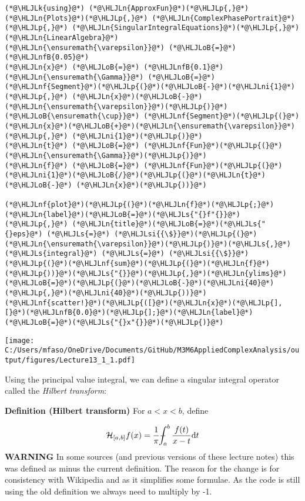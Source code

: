 \documentclass[12pt,a4paper]{article}
\newcommand{\HLJLk}[1]{\textcolor[RGB]{148,91,176}{\textbf{#1}}}
\newcommand{\HLJLn}[1]{#1}
\newcommand{\HLJLnf}[1]{\textcolor[RGB]{66,102,213}{#1}}
\newcommand{\HLJLs}[1]{\textcolor[RGB]{201,61,57}{#1}}
\newcommand{\HLJLsi}[1]{#1}
\newcommand{\HLJLnfB}[1]{\textcolor[RGB]{59,151,46}{#1}}
\newcommand{\HLJLni}[1]{\textcolor[RGB]{59,151,46}{#1}}
\newcommand{\HLJLoB}[1]{\textcolor[RGB]{102,102,102}{\textbf{#1}}}
\newcommand{\HLJLp}[1]{#1}
\def\D{ {\rm d} }
\def\HH{ {\cal H} }
\def\Xint#1{ \mathchoice
   {\XXint\displaystyle\textstyle{#1} }%
   {\XXint\textstyle\scriptstyle{#1} }%
   {\XXint\scriptstyle\scriptscriptstyle{#1} }%
   {\XXint\scriptscriptstyle\scriptscriptstyle{#1} }%
   \!\int}
\def\XXint#1#2#3{ {\setbox0=\hbox{$#1{#2#3}{\int}$}
     \vcenter{\hbox{$#2#3$}}\kern-.5\wd0} }
\def\dashint{\Xint-}
\begin{document}
\begin{lstlisting}
(*@\HLJLk{using}@*) (*@\HLJLn{ApproxFun}@*)(*@\HLJLp{,}@*) (*@\HLJLn{Plots}@*)(*@\HLJLp{,}@*) (*@\HLJLn{ComplexPhasePortrait}@*)(*@\HLJLp{,}@*) (*@\HLJLn{SingularIntegralEquations}@*)(*@\HLJLp{,}@*) (*@\HLJLn{LinearAlgebra}@*)
(*@\HLJLn{\ensuremath{\varepsilon}}@*) (*@\HLJLoB{=}@*) (*@\HLJLnfB{0.05}@*)
(*@\HLJLn{x}@*) (*@\HLJLoB{=}@*) (*@\HLJLnfB{0.1}@*)
(*@\HLJLn{\ensuremath{\Gamma}}@*) (*@\HLJLoB{=}@*) (*@\HLJLnf{Segment}@*)(*@\HLJLp{(}@*)(*@\HLJLoB{-}@*)(*@\HLJLni{1}@*) (*@\HLJLp{,}@*) (*@\HLJLn{x}@*)(*@\HLJLoB{-}@*)(*@\HLJLn{\ensuremath{\varepsilon}}@*)(*@\HLJLp{)}@*) (*@\HLJLoB{\ensuremath{\cup}}@*) (*@\HLJLnf{Segment}@*)(*@\HLJLp{(}@*)(*@\HLJLn{x}@*)(*@\HLJLoB{+}@*)(*@\HLJLn{\ensuremath{\varepsilon}}@*) (*@\HLJLp{,}@*) (*@\HLJLni{1}@*)(*@\HLJLp{)}@*)
(*@\HLJLn{t}@*) (*@\HLJLoB{=}@*) (*@\HLJLnf{Fun}@*)(*@\HLJLp{(}@*)(*@\HLJLn{\ensuremath{\Gamma}}@*)(*@\HLJLp{)}@*)
(*@\HLJLn{f}@*) (*@\HLJLoB{=}@*) (*@\HLJLnf{Fun}@*)(*@\HLJLp{(}@*)(*@\HLJLni{1}@*)(*@\HLJLoB{/}@*)(*@\HLJLp{(}@*)(*@\HLJLn{t}@*) (*@\HLJLoB{-}@*) (*@\HLJLn{x}@*)(*@\HLJLp{))}@*)

(*@\HLJLnf{plot}@*)(*@\HLJLp{(}@*)(*@\HLJLn{f}@*)(*@\HLJLp{;}@*) (*@\HLJLn{label}@*)(*@\HLJLoB{=}@*)(*@\HLJLs{"{}f"{}}@*)(*@\HLJLp{,}@*) (*@\HLJLn{title}@*)(*@\HLJLoB{=}@*)(*@\HLJLs{"{}eps}@*) (*@\HLJLs{=}@*) (*@\HLJLsi{{\$}}@*)(*@\HLJLp{(}@*)(*@\HLJLn{\ensuremath{\varepsilon}}@*)(*@\HLJLp{)}@*)(*@\HLJLs{,}@*) (*@\HLJLs{integral}@*) (*@\HLJLs{=}@*) (*@\HLJLsi{{\$}}@*)(*@\HLJLp{(}@*)(*@\HLJLnf{sum}@*)(*@\HLJLp{(}@*)(*@\HLJLn{f}@*)(*@\HLJLp{))}@*)(*@\HLJLs{"{}}@*)(*@\HLJLp{,}@*)(*@\HLJLn{ylims}@*)(*@\HLJLoB{=}@*)(*@\HLJLp{(}@*)(*@\HLJLoB{-}@*)(*@\HLJLni{40}@*)(*@\HLJLp{,}@*)(*@\HLJLni{40}@*)(*@\HLJLp{))}@*)
(*@\HLJLnf{scatter!}@*)(*@\HLJLp{([}@*)(*@\HLJLn{x}@*)(*@\HLJLp{],[}@*)(*@\HLJLnfB{0.0}@*)(*@\HLJLp{];}@*)(*@\HLJLn{label}@*)(*@\HLJLoB{=}@*)(*@\HLJLs{"{}x"{}}@*)(*@\HLJLp{)}@*)
\end{lstlisting}

\texttt{[image: C:/Users/mfaso/OneDrive/Documents/GitHub/M3M6AppliedComplexAnalysis/output/figures/Lecture13\_1\_1.pdf]}

Using the principal value integral, we can define a singular integral operator called the \emph{Hilbert transform}:

\textbf{Definition (Hilbert transform)} For $a < x < b$, define

\[
\HH_{[a,b]} f(x) =  {1 \over \pi} \dashint_a^b {f(t) \over {x-t}} \D t
\]
\textbf{WARNING} In some sources (and previous versions of these lecture notes) this was defined as minus the current definition. The reason for the change is for consistency with Wikipedia and as it simplifies some formulae. As the code is still using the old definition we always need to multiply by -1.
\end{document}
